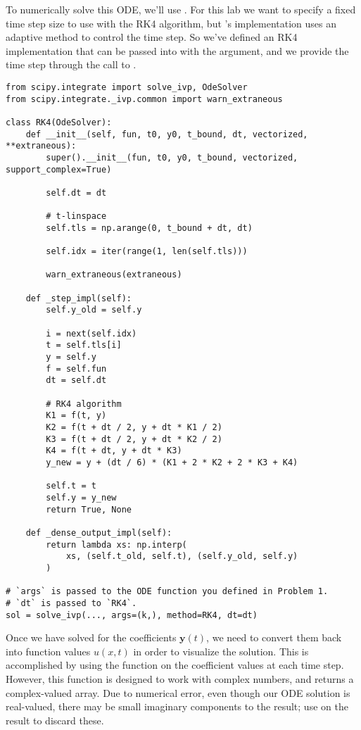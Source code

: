 \noindent To numerically solve this ODE, we'll use .
For this lab we want to specify a fixed time step size to use with the RK4 algorithm, but 's implementation uses an adaptive method to control the time step.
So we've defined an RK4 implementation that can be passed into  with the  argument, and we provide the time step  through the call to .
\begin{lstlisting}
from scipy.integrate import solve_ivp, OdeSolver
from scipy.integrate._ivp.common import warn_extraneous

class RK4(OdeSolver):
    def __init__(self, fun, t0, y0, t_bound, dt, vectorized, **extraneous):
        super().__init__(fun, t0, y0, t_bound, vectorized, support_complex=True)

        self.dt = dt

        # t-linspace
        self.tls = np.arange(0, t_bound + dt, dt)
        
        self.idx = iter(range(1, len(self.tls)))

        warn_extraneous(extraneous)

    def _step_impl(self):
        self.y_old = self.y

        i = next(self.idx)
        t = self.tls[i]
        y = self.y
        f = self.fun
        dt = self.dt

        # RK4 algorithm
        K1 = f(t, y)
        K2 = f(t + dt / 2, y + dt * K1 / 2)
        K3 = f(t + dt / 2, y + dt * K2 / 2)
        K4 = f(t + dt, y + dt * K3)
        y_new = y + (dt / 6) * (K1 + 2 * K2 + 2 * K3 + K4)

        self.t = t
        self.y = y_new
        return True, None

    def _dense_output_impl(self):
        return lambda xs: np.interp(
            xs, (self.t_old, self.t), (self.y_old, self.y)
        )

# `args` is passed to the ODE function you defined in Problem 1.
# `dt` is passed to `RK4`.
sol = solve_ivp(..., args=(k,), method=RK4, dt=dt)
\end{lstlisting}

Once we have solved for the coefficients \(\mathbf{y}(t)\), we need to convert them back into function values \(u(x,t)\) in order to visualize the solution.
This is accomplished by using the  function on the coefficient values at each time step.
However, this function is designed to work with complex numbers, and returns a complex-valued array.
Due to numerical error, even though our ODE solution is real-valued, there may be small imaginary components to the result; use  on the result to discard these.

